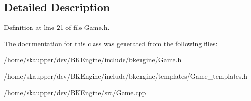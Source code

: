 \subsection{Detailed Description}


Definition at line 21 of file Game.\+h.



The documentation for this class was generated from the following files\+:\begin{DoxyCompactItemize}
\item 
/home/skaupper/dev/\+B\+K\+Engine/include/bkengine/Game.\+h\item 
/home/skaupper/dev/\+B\+K\+Engine/include/bkengine/templates/Game\+\_\+templates.\+h\item 
/home/skaupper/dev/\+B\+K\+Engine/src/Game.\+cpp\end{DoxyCompactItemize}
